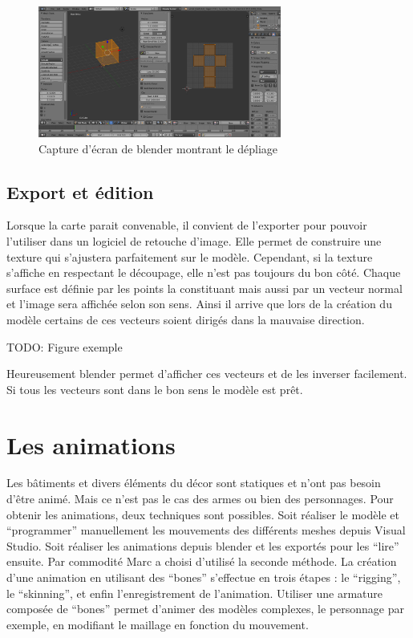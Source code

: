 \documentclass[11pt]{report}
\begin{document}
\begin{figure}[htbp]
\centering
\includegraphics[width=8cm]{unwrap.png}
\caption{Capture d'écran de blender montrant le dépliage}
\end{figure}

\subsection{Export et édition}

Lorsque la carte parait convenable, il convient de l’exporter pour pouvoir l’utiliser dans un logiciel de retouche d’image. Elle permet de construire une texture qui s’ajustera parfaitement sur le modèle.  Cependant, si la texture s’affiche en respectant le découpage, elle n’est pas toujours du bon côté. Chaque surface est définie par les points la constituant mais aussi par un vecteur normal et l’image sera affichée selon son sens. Ainsi il arrive que lors de la création du modèle certains de ces vecteurs soient dirigés dans la mauvaise direction.

TODO: Figure exemple

Heureusement blender permet d’afficher ces vecteurs et de les inverser facilement. Si tous les vecteurs sont dans le bon sens le modèle est prêt.

\section{Les animations}

Les bâtiments et divers éléments du décor sont statiques et n’ont pas besoin d’être animé. Mais ce n’est pas le cas des armes ou bien des personnages. Pour obtenir les animations, deux techniques sont possibles. Soit réaliser le modèle et ``programmer'' manuellement les mouvements des différents meshes depuis Visual Studio.
Soit réaliser les animations depuis blender et les exportés pour les ``lire'' ensuite. Par commodité Marc a choisi d’utilisé la seconde méthode. La création d’une animation en utilisant des ``bones'' s’effectue en trois étapes : le ``rigging'', le ``skinning'', et enfin l’enregistrement de l’animation. Utiliser une armature composée de ``bones'' permet d’animer des modèles complexes, le personnage par exemple, en modifiant le maillage en fonction du mouvement.
\end{document}
